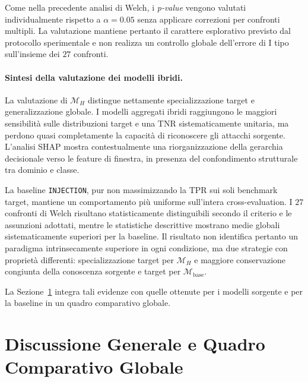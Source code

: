 Come nella precedente analisi di Welch, i \textit{p-value} vengono valutati individualmente rispetto a $\alpha=0.05$ senza applicare correzioni per confronti multipli. 
La valutazione mantiene pertanto il carattere esplorativo previsto dal protocollo sperimentale e non realizza un controllo globale dell'errore di I tipo sull'insieme dei $27$ confronti.

\paragraph{Sintesi della valutazione dei modelli ibridi.}
La valutazione di $\mathcal{M}_{H}$ distingue nettamente specializzazione target e generalizzazione globale. 
I modelli aggregati ibridi raggiungono le maggiori sensibilità sulle distribuzioni target e una TNR sistematicamente unitaria, ma perdono quasi completamente la capacità di riconoscere gli attacchi sorgente. 
L'analisi SHAP mostra contestualmente una riorganizzazione della gerarchia decisionale verso le feature di finestra, in presenza del confondimento strutturale tra dominio e classe.

La baseline \texttt{INJECTION}, pur non massimizzando la TPR sui soli benchmark target, mantiene un comportamento più uniforme sull'intera cross-evaluation. 
I $27$ confronti di Welch risultano statisticamente distinguibili secondo il criterio e le assunzioni adottati, mentre le statistiche descrittive mostrano medie globali sistematicamente superiori per la baseline. 
Il risultato non identifica pertanto un paradigma intrinsecamente superiore in ogni condizione, ma due strategie con proprietà differenti: specializzazione target per $\mathcal{M}_{H}$ e maggiore conservazione congiunta della conoscenza sorgente e target per $\mathcal{M}_{\mathrm{base}}$.

La Sezione~\ref{sec:discussione_generale} integra tali evidenze con quelle ottenute per i modelli sorgente e per la baseline in un quadro comparativo globale.




\section{Discussione Generale e Quadro Comparativo Globale}
\label{sec:discussione_generale}

